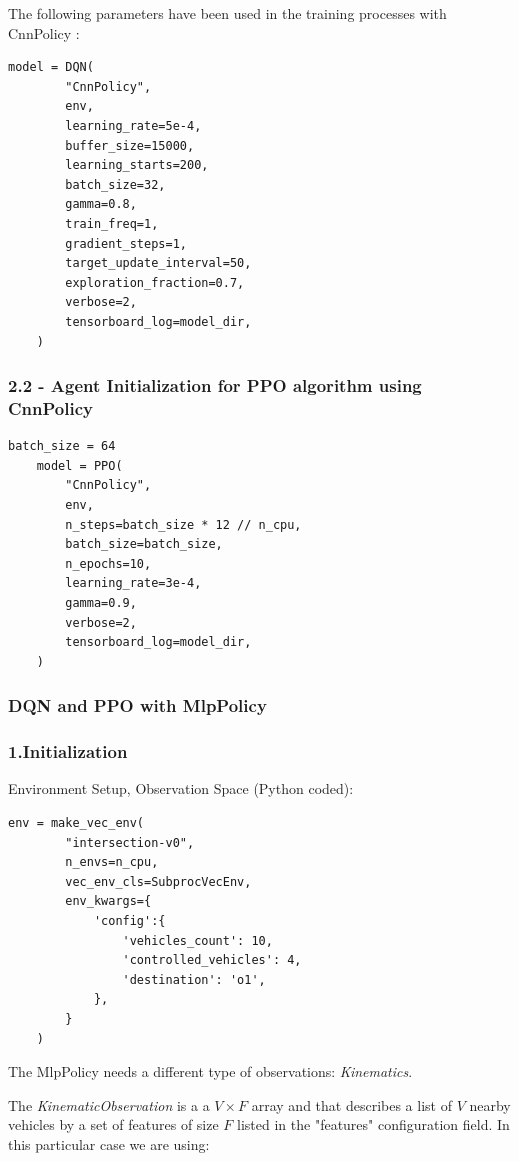 The following parameters have been used in the training processes with CnnPolicy :

\begin{lstlisting}[style=python]
    model = DQN(
        "CnnPolicy",
        env,
        learning_rate=5e-4,
        buffer_size=15000,
        learning_starts=200,
        batch_size=32,
        gamma=0.8,
        train_freq=1,
        gradient_steps=1,
        target_update_interval=50,
        exploration_fraction=0.7,
        verbose=2,
        tensorboard_log=model_dir,
    )
\end{lstlisting}

\subsubsection{2.2 - Agent Initialization for PPO algorithm using CnnPolicy}

\begin{lstlisting}[style=python]
    batch_size = 64
    model = PPO(
        "CnnPolicy",
        env,
        n_steps=batch_size * 12 // n_cpu,
        batch_size=batch_size,
        n_epochs=10,
        learning_rate=3e-4,
        gamma=0.9,
        verbose=2,
        tensorboard_log=model_dir,
    )
\end{lstlisting}

\subsubsection{DQN and PPO with MlpPolicy }

\subsubsection{1.Initialization}

Environment Setup, Observation Space (Python coded): 

\begin{lstlisting}[style=python]
    env = make_vec_env(
        "intersection-v0", 
        n_envs=n_cpu, 
        vec_env_cls=SubprocVecEnv, 
        env_kwargs={
            'config':{
                'vehicles_count': 10,
                'controlled_vehicles': 4,
                'destination': 'o1',
            },
        }
    )

\end{lstlisting}

The MlpPolicy needs a different type of observations: \textit{Kinematics}.

The \textit{KinematicObservation} is a  a \( V \times F \) array  and that describes a list of \( V \) nearby vehicles by a set of features of size  \( F \)
listed in the "features" configuration field. In this particular case we are using:

